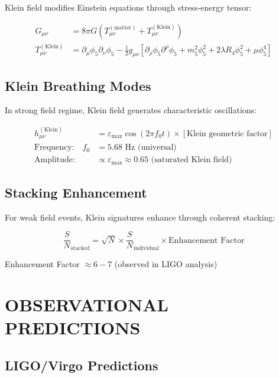 \documentclass[12pt,a4paper]{article}
\begin{document}
Klein field modifies Einstein equations through stress-energy tensor:

\begin{align}
G_{\mu\nu} &= 8\pi G(T_{\mu\nu}^{(\text{matter})} + T_{\mu\nu}^{(\text{Klein})})\\
T_{\mu\nu}^{(\text{Klein})} &= \partial_\mu\phi_5 \partial_\nu\phi_5 - \frac{1}{2}g_{\mu\nu}[\partial_\rho\phi_5 \partial^\rho\phi_5 + m_5^2\phi_5^2 + 2\lambda R_4\phi_5^2 + \mu\phi_5^4]
\end{align}

\subsection{Klein Breathing Modes}

In strong field regime, Klein field generates characteristic oscillations:

\begin{align}
h_{\mu\nu}^{(\text{Klein})} &= \varepsilon_{\max} \cos(2\pi f_0 t) \times [\text{Klein geometric factor}]\\
\text{Frequency:} \quad f_0 &= 5.68 \text{ Hz (universal)}\\
\text{Amplitude:} \quad &\propto \varepsilon_{\max} \approx 0.65 \text{ (saturated Klein field)}
\end{align}

\subsection{Stacking Enhancement}

For weak field events, Klein signatures enhance through coherent stacking:

\begin{equation}
\frac{S}{N}_{\text{stacked}} = \sqrt{N} \times \frac{S}{N}_{\text{individual}} \times \text{Enhancement Factor}
\end{equation}

Enhancement Factor $\approx 6-7$ (observed in LIGO analysis)

\section{OBSERVATIONAL PREDICTIONS}

\subsection{LIGO/Virgo Predictions}
\end{document}

